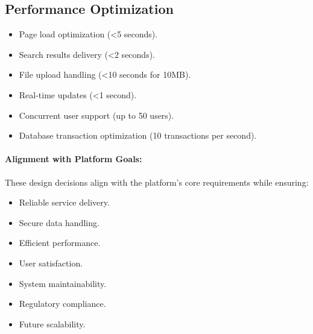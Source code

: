 \subsection{Performance Optimization}
\label{subsec:performance_optimization}
\begin{itemize}
    \item Page load optimization (\textless 5 seconds).
    \item Search results delivery (\textless 2 seconds).
    \item File upload handling (\textless 10 seconds for 10MB).
    \item Real-time updates (\textless 1 second).
    \item Concurrent user support (up to 50 users).
    \item Database transaction optimization (10 transactions per second).
\end{itemize}

\paragraph{Alignment with Platform Goals:}
These design decisions align with the platform's core requirements while ensuring:
\begin{itemize}
    \item Reliable service delivery.
    \item Secure data handling.
    \item Efficient performance.
    \item User satisfaction.
    \item System maintainability.
    \item Regulatory compliance.
    \item Future scalability.
\end{itemize}
